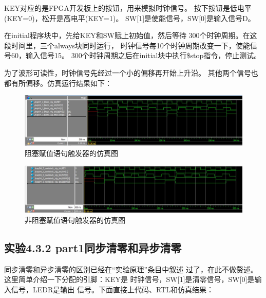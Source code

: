 \documentclass[12pt,a4paper,UTF8]{article}
\begin{document}
KEY对应的是FPGA开发板上的按钮，用来模拟时钟信号。
按下按钮是低电平(KEY=0)，松开是高电平(KEY=1)。
SW[1]是使能信号，SW[0]是输入信号D。

在initial程序块中，先给KEY和SW赋上初始值，然后等待
300个时钟周期。在这段时间里，三个always块同时运行，
时钟信号每10个时钟周期改变一下，使能信号60，输入信号15。
300个时钟周期之后在initial块中执行\$stop指令，停止测试。

为了波形可读性，时钟信号先经过一个小的偏移再开始上升沿。
其他两个信号也都有所偏移。仿真运行结果如下：
\begin{figure}[H]
  \centering
  \includegraphics[width=1\textwidth]{sim_blk_asn.JPG}
  \caption{阻塞赋值语句触发器的仿真图}
  \label{sim_blk}
\end{figure}

\begin{figure}[H]
  \centering
  \includegraphics[width=1\textwidth]{sim_nblk_asn.JPG}
  \caption{非阻塞赋值语句触发器的仿真图}
  \label{sim_nblk}
\end{figure}

\subsection{实验4.3.2 part1同步清零和异步清零}
同步清零和异步清零的区别已经在``实验原理''条目中叙述
过了，在此不做赘述。这里简单介绍一下分配的引脚：KEY是
时钟信号，SW[1]是清零信号，SW[0]是输入信号，LEDR是输出
信号。下面直接上代码、RTL和仿真结果：
\end{document}
